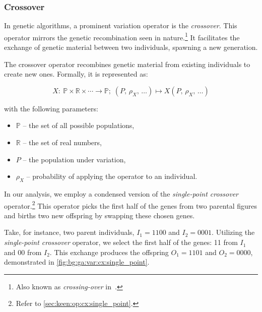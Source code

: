 
\subsubsection{Crossover}
\label{sec:bg:ga:var:cx}
  In genetic algorithms, a prominent variation operator is the 
  \emph{crossover}.
  This operator mirrors the genetic recombination seen in nature.\footnote{
    Also known as \emph{crossing-over} 
    in~\autocite{hollandAdaptationNaturalArtificial1992a}.
  }
  It facilitates the exchange of genetic material between two individuals, 
  spawning a new generation.

  \begin{definition}
  \label{def:crossover_operator}
    The crossover operator recombines genetic material from existing 
    individuals to create new ones.
    Formally, it is represented as:

    \[
      X :\: \mathbb{P} \times \mathbb{R} \times \cdots \to \mathbb{P};\;
      (P,\, \rho_X,\, \dots) \mapsto X(P,\, \rho_X,\, \dots)
    \]

    with the following parameters:

    \begin{itemize}
      \item \(\mathbb{P}\) -- the set of all possible populations,
      \item \(\mathbb{R}\) -- the set of real numbers,
      \item \(P\) -- the population under variation,
      \item \(\rho_X\) -- probability of applying the operator to an individual.
    \end{itemize}
  \end{definition}

  In our analysis, we employ a condensed version of the \emph{single-point 
  crossover} operator.\footnote{
    Refer to \vref{sec:keen:op:cx:single_point}.
  }
  This operator picks the first half of the genes from two parental figures and 
  births two new offspring by swapping these chosen genes. 

  Take, for instance, two parent individuals, \(I_1 = 1100\) and \(I_2 = 
  0001\).
  Utilizing the \textit{single-point crossover} operator, we select the first 
  half of the genes: 11 from \(I_1\) and 00 from \(I_2\).
  This exchange produces the offspring \(O_1 = 1101\) and \(O_2 = 0000\), 
  demonstrated in 
  \vref{fig:bg:ga:var:cx:single_point}.

